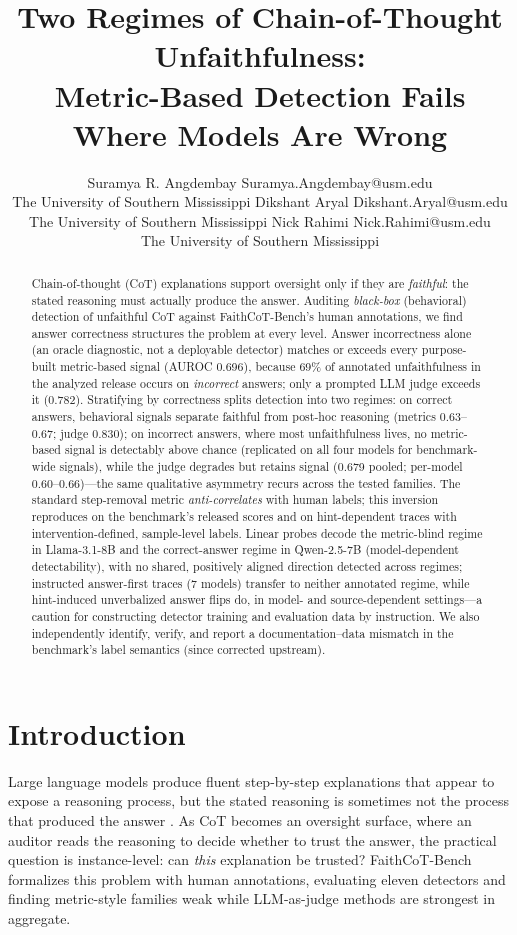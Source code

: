 \documentclass{article}
\title{Two Regimes of Chain-of-Thought Unfaithfulness:\\Metric-Based Detection Fails Where Models Are Wrong}
\author{\name Suramya R. Angdembay \email Suramya.Angdembay@usm.edu \\
      \addr The University of Southern Mississippi
      \AND
      \name Dikshant Aryal \email Dikshant.Aryal@usm.edu \\
      \addr The University of Southern Mississippi
      \AND
      \name Nick Rahimi \email Nick.Rahimi@usm.edu \\
      \addr The University of Southern Mississippi}
\begin{document}
\maketitle

\begin{abstract}
Chain-of-thought (CoT) explanations support oversight only if they are \emph{faithful}: the stated reasoning must actually produce the answer. Auditing \emph{black-box} (behavioral) detection of unfaithful CoT against FaithCoT-Bench's human annotations, we find answer correctness structures the problem at every level. Answer incorrectness alone (an oracle diagnostic, not a deployable detector) matches or exceeds every purpose-built metric-based signal (AUROC 0.696), because 69\% of annotated unfaithfulness in the analyzed release occurs on \emph{incorrect} answers; only a prompted LLM judge exceeds it (0.782). Stratifying by correctness splits detection into two regimes: on correct answers, behavioral signals separate faithful from post-hoc reasoning (metrics 0.63--0.67; judge 0.830); on incorrect answers, where most unfaithfulness lives, no metric-based signal is detectably above chance (replicated on all four models for benchmark-wide signals), while the judge degrades but retains signal (0.679 pooled; per-model 0.60--0.66)---the same qualitative asymmetry recurs across the tested families. The standard step-removal metric \emph{anti-correlates} with human labels; this inversion reproduces on the benchmark's released scores and on hint-dependent traces with intervention-defined, sample-level labels. Linear probes decode the metric-blind regime in Llama-3.1-8B and the correct-answer regime in Qwen-2.5-7B (model-dependent detectability), with no shared, positively aligned direction detected across regimes; instructed answer-first traces (7 models) transfer to neither annotated regime, while hint-induced unverbalized answer flips do, in model- and source-dependent settings---a caution for constructing detector training and evaluation data by instruction. We also independently identify, verify, and report a documentation--data mismatch in the benchmark's label semantics (since corrected upstream).
\end{abstract}

\section{Introduction}

Large language models produce fluent step-by-step explanations that appear to expose a reasoning process, but the stated reasoning is sometimes not the process that produced the answer \citep{lanham2023measuring,turpin2023language,chen2025reasoning}. As CoT becomes an oversight surface, where an auditor reads the reasoning to decide whether to trust the answer, the practical question is instance-level: can \emph{this} explanation be trusted? FaithCoT-Bench \citep{shen2026faithcot} formalizes this problem with human annotations, evaluating eleven detectors and finding metric-style families weak while LLM-as-judge methods are strongest in aggregate.
\end{document}
